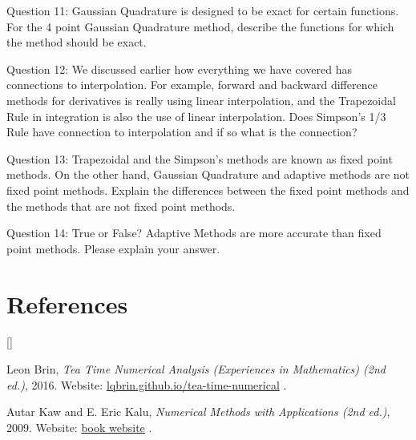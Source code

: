 \documentclass{article}
\def\beginrefs{\begin{list}%
        {[\arabic{equation}]}{\usecounter{equation}
         \setlength{\leftmargin}{2.0truecm}\setlength{\labelsep}{0.4truecm}%
         \setlength{\labelwidth}{1.6truecm}}}
\def\endrefs{\end{list}}
\def\bibentry#1{\item[\hbox{[#1]}]}
\begin{document}
\medskip \par \noindent
%
Question 11: Gaussian Quadrature is designed to be exact for certain functions. For the 4 point Gaussian Quadrature method, describe the functions for which the method should be exact. 
\medskip \par \noindent
%
Question 12: We discussed earlier how everything we have covered has connections to interpolation. For example, forward and backward difference methods for derivatives is really using linear interpolation, and the Trapezoidal Rule in integration is also the use of linear interpolation. Does Simpson's 1/3 Rule have connection to interpolation and if so what is the connection? 
\medskip \par \noindent
%
Question 13: Trapezoidal and the Simpson's methods are known as fixed point methods. On the other hand, Gaussian Quadrature and adaptive methods are not fixed point methods. Explain the differences between the fixed point methods and the methods that are not fixed point methods. 
\medskip \par \noindent
%
Question 14: True or False?  Adaptive Methods are more accurate than fixed point methods. Please explain your answer. 

\par \bigskip \par

\section*{References}
\beginrefs


\bibentry{LB16}{\sc Leon Brin},
{\it Tea Time Numerical Analysis (Experiences in Mathematics)  (2nd ed.)}, 2016. Website: \href{http://lqbrin.github.io/tea-time-numerical/}{lqbrin.github.io/tea-time-numerical} .

\bibentry{KK09} {\sc Autar Kaw} and {\sc E. Eric Kalu}, {\it Numerical Methods with Applications (2nd ed.)}, 2009. Website: \href{http://autarkaw.com/books/numericalmethods/index.html}{book website} .

\endrefs
\end{document}
